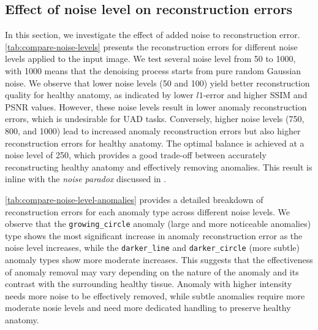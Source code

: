 \subsection{Effect of noise level on reconstruction errors}
In this section, we investigate the effect of added noise to reconstruction error. \cref{tab:compare-noise-levels} presents the reconstruction errors for different noise levels applied to the input image. We test several noise level from 50 to 1000, with 1000 means that the denoising process starts from pure random Gaussian noise. We observe that lower noise levels (50 and 100) yield better reconstruction quality for healthy anatomy, as indicated by lower $l1$-error and higher SSIM and PSNR values. However, these noise levels result in lower anomaly reconstruction errors, which is undesirable for UAD tasks. Conversely, higher noise levels (750, 800, and 1000) lead to increased anomaly reconstruction errors but also higher reconstruction errors for healthy anatomy. The optimal balance is achieved at a noise level of 250, which provides a good trade-off between accurately reconstructing healthy anatomy and effectively removing anomalies. This result is inline with the \emph{noise paradox} discussed in \cite{autoDDPM}.  

\cref{tab:compare-noise-level-anomalies} provides a detailed breakdown of reconstruction errors for each anomaly type across different noise levels. We observe that the \texttt{growing\_circle} anomaly (large and more noticeable anomalies) type shows the most significant increase in anomaly reconstruction error as the noise level increases, while the \texttt{darker\_line} and \texttt{darker\_circle} (more subtle) anomaly types show more moderate increases. This suggests that the effectiveness of anomaly removal may vary depending on the nature of the anomaly and its contrast with the surrounding healthy tissue. Anomaly with higher intensity needs more noise to be effectively removed, while subtle anomalies require more moderate nosie levels and need more dedicated handling to preserve healthy anatomy.

